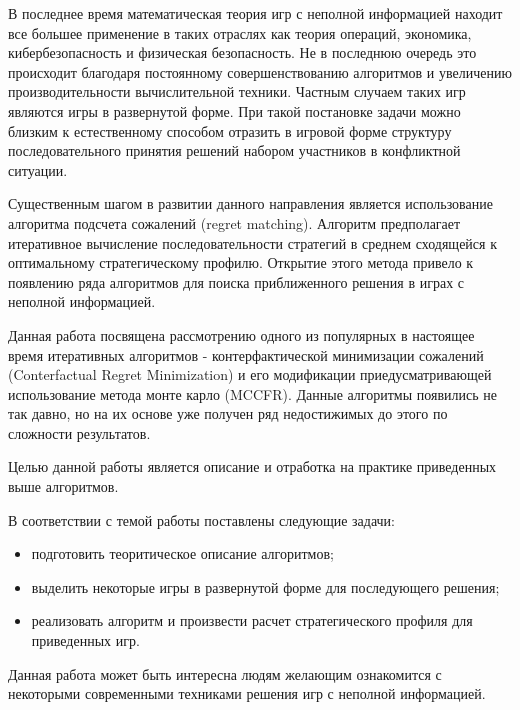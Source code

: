 \Introduction

\par
В последнее время математическая теория игр с неполной информацией находит все большее применение в таких отраслях как теория операций, экономика, кибербезопасность и физическая безопасность. Не в последнюю очередь это происходит благодаря постоянному совершенствованию алгоритмов и увеличению производительности вычислительной техники. Частным случаем таких игр являются игры в развернутой форме. При такой постановке задачи можно близким к естественному способом отразить в игровой форме структуру последовательного принятия решений набором участников в конфликтной ситуации.
\par
Существенным шагом в развитии данного направления является использование алгоритма подсчета сожалений (regret matching). Алгоритм предполагает итеративное вычисление последовательности стратегий в среднем сходящейся к оптимальному стратегическому профилю. Открытие этого метода привело к появлению ряда алгоритмов для поиска приближенного решения в играх с неполной информацией.
\par
Данная работа посвящена рассмотрению одного из популярных в настоящее время итеративных алгоритмов -  контерфактической минимизации сожалений (Conterfactual Regret Minimization) и его модификации приедусматривающей использование метода монте карло (MCCFR). Данные алгоритмы появились не так давно, но на их основе уже получен ряд недостижимых до этого по сложности результатов. 
\par
Целью данной работы является описание и отработка на практике приведенных выше алгоритмов.
\par
В соответствии с темой работы поставлены следующие задачи:
\begin{itemize}
	\item подготовить теоритическое описание алгоритмов;
	\item выделить некоторые игры в развернутой форме для последующего решения;
	\item реализовать алгоритм и произвести расчет стратегического профиля для приведенных игр.
\end{itemize}
\par
Данная работа может быть интересна людям желающим ознакомится с некоторыми современными техниками решения игр с неполной информацией.
